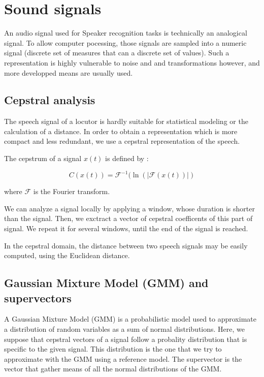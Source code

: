 \documentclass[conference]{IEEEtran}
\begin{document}
\section{Sound signals}

An audio signal used for Speaker recognition tasks is technically an analogical
signal. To allow computer pocessing, those signals are sampled into a numeric
signal (discrete set of measures that can a discrete set of values). Such a
representation is highly vulnerable to noise and and transformations however,
and more developped means are usually used.

\subsection{Cepstral analysis}

The speech signal of a locutor is hardly suitable for statistical modeling or
the calculation of a distance.
In order to obtain a representation which is more compact and less redundant, we
use a cepstral representation of the speech. 

The cepstrum of a signal $x(t)$ is defined by :

$$C(x(t)) = \mathcal{F}^{-1}(\ln(|\mathcal{F}(x(t))|)$$

where $\mathcal{F}$ is the Fourier transform.


We can analyze a signal locally by applying a window, whose duration is shorter
than the signal. Then, we exctract a vector of cepstral coefficents of this part
of signal. We repeat it for several windows, until the end of the signal is
reached. 

In the cepstral domain, the distance between two speech signals may be easily
computed, using the Euclidean distance. 


\subsection{Gaussian Mixture Model (GMM) and supervectors}

A Gaussian Mixture Model (GMM) is a probabilistic model used to approximate a distribution of random variables as a sum of normal distributions. 
Here, we suppose that cepstral vectors of a signal follow a probality
distribution that is specific to the given signal. This distribution is the one
that we try to approximate with the GMM using a reference model. The supervector
is the vector that gather means of all the normal distributions of the GMM. 
\end{document}
